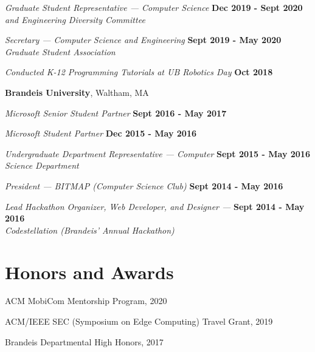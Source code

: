 \documentclass[margin,line]{res}
\begin{document}
\begin{resume}
\vspace{-.3cm}
{\em Graduate Student Representative --- Computer Science } \hfill {\bf Dec 2019 - Sept 2020}\\
{\em and Engineering Diversity Committee}

\vspace{-.3cm}
{\em Secretary --- Computer Science and Engineering} \hfill {\bf Sept 2019 - May 2020} \\
{\em Graduate Student Association}

\vspace{-.3cm}
{\em Conducted K-12 Programming Tutorials at UB Robotics Day } \hfill {\bf Oct 2018} 



{\bf Brandeis University}, Waltham, MA 

\vspace{-.3cm}
{\em Microsoft Senior Student Partner } \hfill  {\bf Sept 2016 - May 2017}

\vspace{-.3cm}
{\em Microsoft Student Partner } \hfill  {\bf Dec 2015 - May 2016}

\vspace{-.3cm}
{\em Undergraduate Department Representative --- Computer } \hfill  {\bf Sept 2015 - May 2016} \\
{\em Science Department}

\vspace{-.3cm}
{\em President --- BITMAP (Computer Science Club)} \hfill  {\bf Sept 2014 - May 2016}

\vspace{-.3cm}
{\em Lead Hackathon Organizer, Web Developer, and Designer ---} \hfill {\bf Sept 2014 - May 2016} \\
{\em Codestellation (Brandeis' Annual Hackathon)}

\section{\sc Honors and Awards} 
ACM MobiCom Mentorship Program, 2020

\vspace*{-2.5mm}
ACM/IEEE SEC (Symposium on Edge Computing) Travel Grant, 2019

\vspace*{-2.5mm}
Brandeis Departmental High Honors, 2017




\end{resume}
\end{document}
